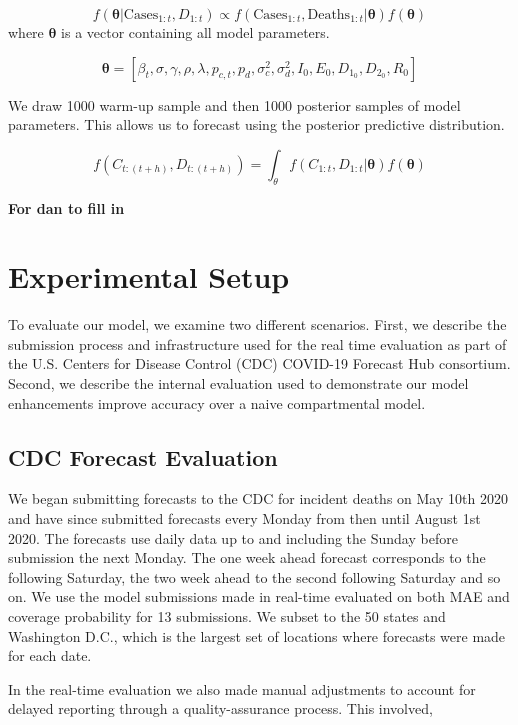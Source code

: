 \documentclass[11pt]{amsart}
\begin{document}
\begin{equation}
f(\bm{\theta} | \text{Cases}_{1:t},D_{1:t}) \propto f(\text{Cases}_{1:t},\text{Deaths}_{1:t} | \bm{\theta})f(\bm{\theta})
\end{equation}
where $\bm{\theta}$ is a vector containing all model parameters. 

\begin{equation}
\bm{\theta} =[\beta_{t} ,
\sigma ,
\gamma ,
\rho ,
\lambda ,
p_{c,t} ,
p_{d} ,
\sigma_c^2 ,
\sigma_d^2 ,
I_0 ,
E_0 ,
D_{1_0} ,
D_{2_0} ,
R_0 ]
\end{equation}

We draw 1000 warm-up sample and then 1000 posterior samples of model parameters. This allows us to forecast using the posterior predictive distribution.

\begin{equation}
f(C_{t:(t+h)}, D_{t:(t+h)}) =  \int_{\theta} f(C_{1:t},D_{1:t} | \bm{\theta})f(\bm{\theta})
\end{equation}

\textbf{For dan to fill in}
 \section{Experimental Setup}
 To evaluate our model, we examine two different scenarios. First, we describe the submission process and infrastructure used for the real time evaluation as part of the U.S. Centers for Disease Control (CDC) COVID-19 Forecast Hub consortium. Second, we describe the internal evaluation used to demonstrate our model enhancements improve accuracy over a naive compartmental model. 
 
 \subsection{CDC Forecast Evaluation}
We began submitting forecasts to the CDC for incident deaths on May 10th 2020 and have since submitted forecasts every Monday from then until August 1st 2020. The forecasts use daily data up to and including the Sunday before submission the next Monday. The one week ahead forecast corresponds to the following Saturday, the two week ahead to the second following Saturday and so on.  We use the model submissions made in real-time evaluated on both MAE and coverage probability for 13 submissions. We subset to the 50 states and Washington D.C., which is the largest set of locations where forecasts were made for each date. 
 
 In the real-time evaluation we also made manual adjustments to account for delayed reporting through a quality-assurance process. This involved,
 
\end{document}
